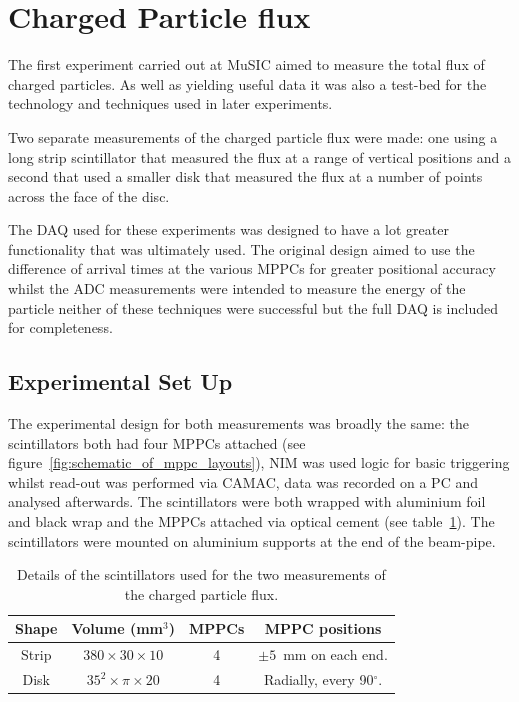\clearpage
\section{Charged Particle flux} %
\label{cha:charged_particle_flux}
The first experiment carried out at MuSIC aimed to measure the total flux of charged particles. As well as yielding useful data it was also a test-bed for the technology and techniques used in later experiments.

Two separate measurements of the charged particle flux were made: one using a long strip scintillator that measured the flux at a range of vertical positions and a second that used a smaller disk that measured the flux at a number of points across the face of the disc.

The DAQ used for these experiments was designed to have a lot greater functionality that was ultimately used. The original design aimed to use the difference of arrival times at the various MPPCs for greater positional accuracy whilst the ADC measurements were intended to measure the energy of the particle neither of these techniques were successful but the full DAQ is included for completeness.

\subsection{Experimental Set Up} %
\label{sec:experimental_set_up}
The experimental design for both measurements was broadly the same: the scintillators both had four MPPCs attached (see figure~\ref{fig:schematic_of_mppc_layouts}), NIM was used logic for basic triggering whilst read-out was performed via CAMAC, data was recorded on a PC and analysed afterwards. The scintillators were both wrapped with aluminium foil and black wrap and the MPPCs attached via optical cement (see table~\ref{tab:charged_particle_flux_scint_details}). The scintillators were mounted on aluminium supports at the end of the beam-pipe.
\begin{table}
  \begin{center}
    \begin{tabular}{c|c|c|c}
      Shape  &  Volume (mm\(^3\))           &  MPPCs  &  MPPC positions                    \\
      \hline
      Strip  &  \(380 \times30\times10\)    &  4      &  \( \pm 5 \)~mm on each end.       \\
      Disk   &  \( 35^2\times\pi\times20\)  &  4      &  Radially, every 90\( ^{\circ} \). \\
    \end{tabular}
  \end{center}
  \caption{Details of the scintillators used for the two measurements of the charged particle flux.}
  \label{tab:charged_particle_flux_scint_details}
\end{table}

